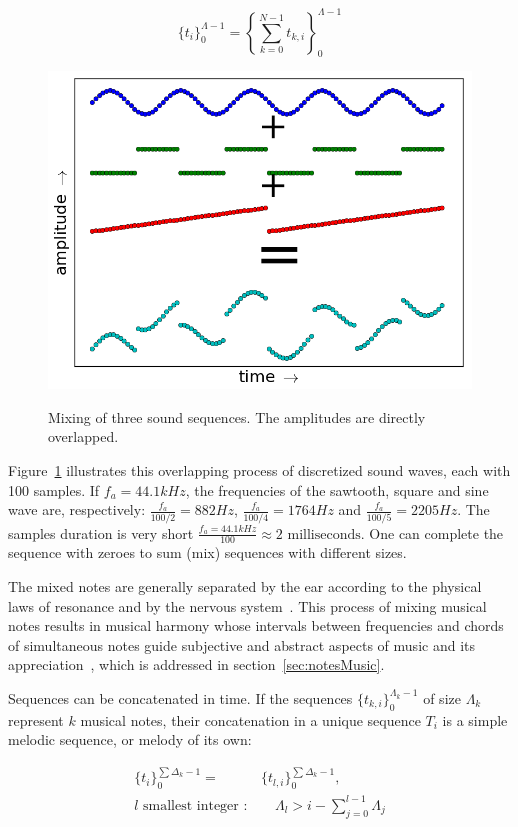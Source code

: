 \begin{equation}\label{eq:mixagem}
\{t_i\}_0^{\Lambda-1}=\left \{ \sum_{k=0}^{N-1}t_{k,i} \right \}_0^{\Lambda-1}
\end{equation}

\begin{figure}[h!]
    {\centering
        \includegraphics[width=.7\columnwidth]{figures/mixagem_}}
    \caption{Mixing of three sound sequences. The amplitudes are directly overlapped.}
        \label{fig:mixagem}
\end{figure}

Figure~\ref{fig:mixagem} illustrates this overlapping process of discretized sound waves, each with 100 samples. If $f_a=44.1kHz$, the frequencies of the sawtooth, square and sine wave are, respectively: $\frac{f_a}{100/2}=882Hz$, $\frac{f_a}{100/4}=1764Hz$ and $\frac{f_a}{100/5}=2205Hz$. The samples duration is very short $\frac{f_a=44.1kHz}{100} \approx 2 \text{ milliseconds}$. One can complete the sequence with zeroes to sum (mix) sequences with different sizes.

The mixed notes are generally separated by the ear according to the physical laws of resonance and by the nervous system~\cite{Roederer}.  This process of mixing musical notes results in musical harmony whose intervals between frequencies and chords of simultaneous notes guide subjective and abstract aspects of music and its appreciation~\cite{Harmonia}, which is addressed in section~\ref{sec:notesMusic}. 

Sequences can be concatenated in time. If the sequences $\{t_{k,i}\}_0^{\Lambda_k-1}$ of size $\Lambda_k$ represent $k$ musical notes, their concatenation in a unique sequence $T_i$ is a simple melodic sequence, or melody of its own:

\begin{equation}\label{eq:concatenacao}
\begin{split}
\{t_i\}_0^{\sum\Delta_k-1}= & \{t_{l,i}\}_0^{\sum\Delta_k-1}, \;\; \\ l\text{ smallest integer } : & \quad \Lambda_l > i -\sum_{j=0}^{l-1}\Lambda_j
\end{split}
\end{equation}

